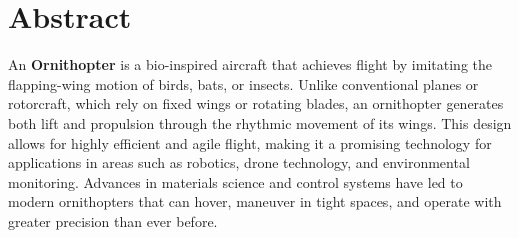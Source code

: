 \chapter*{Abstract}
\thispagestyle{empty}

An \textbf{Ornithopter} is a bio-inspired aircraft that achieves flight by imitating the flapping-wing motion of birds, bats, or insects. Unlike conventional planes or rotorcraft, which rely on fixed wings or rotating blades, an ornithopter generates both lift and propulsion through the rhythmic movement of its wings. This design allows for highly efficient and agile flight, making it a promising technology for applications in areas such as robotics, drone technology, and environmental monitoring. Advances in materials science and control systems have led to modern ornithopters that can hover, maneuver in tight spaces, and operate with greater precision than ever before.